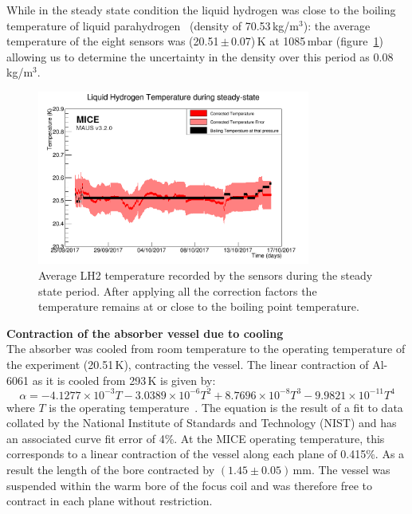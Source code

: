 While in the steady state condition the liquid hydrogen was close to the
boiling temperature of liquid parahydrogen~\cite{NOTE524} (density of 70.53\,kg/m$^{3}$):
the average temperature of the eight sensors was (20.51\,$\mathrm{\pm}$\,0.07)\,K at 1085\,mbar
(figure~\ref{Fig:TempCalibrated}) allowing us to determine the
uncertainty in the density over this period as 0.08\,kg/m$^{3}$. \\
\begin{figure}
  \begin{center}
    \includegraphics[width=0.80\textwidth]{SteadyState60mK_logo.png}
  \end{center}
  \caption{
    Average LH2 temperature recorded by the sensors during the
    steady state period.
    After applying all the correction factors the temperature remains
    at or close to the boiling point temperature.
  }
  \label{Fig:TempCalibrated}
\end{figure}
 

\noindent\textbf{Contraction of the absorber vessel due to cooling} \\
\noindent
The absorber was cooled from room temperature to the operating
temperature of the experiment (20.51\,K), contracting the vessel.
The linear contraction of Al-6061 as it is cooled from 293\,K is given
by: 
\begin{equation}
  \alpha =-4.1277\times {10}^{-3}T-3.0389\times {10}^{-6}T^2+8.7696\times {10}^{-8}T^3-9.9821\times {10}^{-11}T^4
\end{equation}
where $T$ is the operating temperature~\cite{Hardin}.
The equation is the result of a fit to data collated by the National
Institute of Standards and Technology (NIST) and has an associated
curve fit error of 4\%. 
At the MICE operating temperature, this corresponds to a linear
contraction of the vessel along each plane of 0.415\%.
As a result the length of the bore contracted by
$(1.45 \pm 0.05)$\,mm.
The vessel was suspended within the warm bore of the focus coil and
was therefore free to contract in each plane without restriction.  \\

